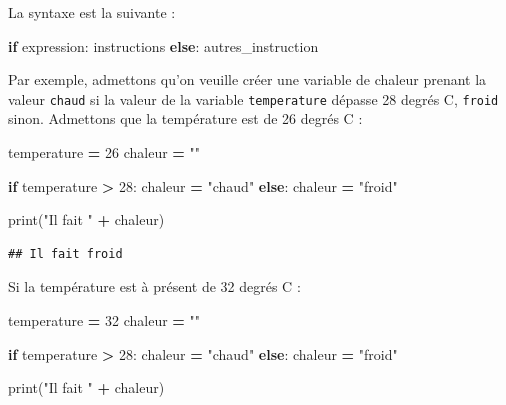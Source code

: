 \documentclass[12pt,]{book}
\newenvironment{Shaded}{\begin{snugshade}}{\end{snugshade}}
\newcommand{\DecValTok}[1]{\textcolor[rgb]{0.00,0.00,0.81}{#1}}
\newcommand{\StringTok}[1]{\textcolor[rgb]{0.31,0.60,0.02}{#1}}
\newcommand{\ControlFlowTok}[1]{\textcolor[rgb]{0.13,0.29,0.53}{\textbf{#1}}}
\newcommand{\OperatorTok}[1]{\textcolor[rgb]{0.81,0.36,0.00}{\textbf{#1}}}
\newcommand{\BuiltInTok}[1]{#1}
\newcommand{\NormalTok}[1]{#1}
\numberwithin{equation}{section}
\numberwithin{countremarque}{section}
\begin{document}
La syntaxe est la suivante :

\begin{Shaded}
\begin{Highlighting}[]
\ControlFlowTok{if}\NormalTok{ expression:}
\NormalTok{  instructions}
\ControlFlowTok{else}\NormalTok{:}
\NormalTok{  autres_instruction}
\end{Highlighting}
\end{Shaded}

Par exemple, admettons qu'on veuille créer une variable de chaleur
prenant la valeur \texttt{chaud} si la valeur de la variable
\texttt{temperature} dépasse 28 degrés C, \texttt{froid} sinon.
Admettons que la température est de 26 degrés C :

\begin{Shaded}
\begin{Highlighting}[]
\NormalTok{temperature }\OperatorTok{=} \DecValTok{26}
\NormalTok{chaleur }\OperatorTok{=} \StringTok{""}

\ControlFlowTok{if}\NormalTok{ temperature }\OperatorTok{>} \DecValTok{28}\NormalTok{:}
\NormalTok{  chaleur }\OperatorTok{=} \StringTok{"chaud"}
\ControlFlowTok{else}\NormalTok{:}
\NormalTok{  chaleur }\OperatorTok{=} \StringTok{"froid"}

\BuiltInTok{print}\NormalTok{(}\StringTok{"Il fait "} \OperatorTok{+}\NormalTok{ chaleur)}
\end{Highlighting}
\end{Shaded}

\begin{lstlisting}
## Il fait froid
\end{lstlisting}

Si la température est à présent de 32 degrés C :

\begin{Shaded}
\begin{Highlighting}[]
\NormalTok{temperature }\OperatorTok{=} \DecValTok{32}
\NormalTok{chaleur }\OperatorTok{=} \StringTok{""}

\ControlFlowTok{if}\NormalTok{ temperature }\OperatorTok{>} \DecValTok{28}\NormalTok{:}
\NormalTok{  chaleur }\OperatorTok{=} \StringTok{"chaud"}
\ControlFlowTok{else}\NormalTok{:}
\NormalTok{  chaleur }\OperatorTok{=} \StringTok{"froid"}

\BuiltInTok{print}\NormalTok{(}\StringTok{"Il fait "} \OperatorTok{+}\NormalTok{ chaleur)}
\end{Highlighting}
\end{Shaded}
\end{document}
